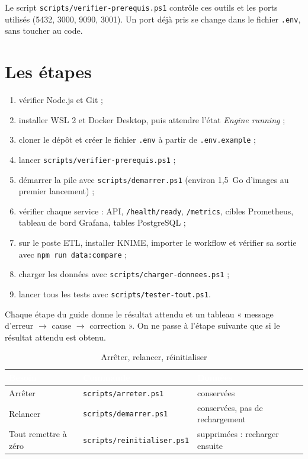 Le script \texttt{scripts/verifier-prerequis.ps1} contrôle ces outils et les ports utilisés
(5432, 3000, 9090, 3001). Un port déjà pris se change dans le fichier \texttt{.env}, sans toucher au code.

\section{Les étapes}
\begin{enumerate}
  \item vérifier Node.js et Git ;
  \item installer WSL 2 et Docker Desktop, puis attendre l'état \emph{Engine running} ;
  \item cloner le dépôt et créer le fichier \texttt{.env} à partir de \texttt{.env.example} ;
  \item lancer \texttt{scripts/verifier-prerequis.ps1} ;
  \item démarrer la pile avec \texttt{scripts/demarrer.ps1} (environ 1,5~Go d'images au premier lancement) ;
  \item vérifier chaque service : API, \texttt{/health/ready}, \texttt{/metrics}, cibles Prometheus, tableau de bord Grafana, tables PostgreSQL ;
  \item sur le poste ETL, installer KNIME, importer le workflow et vérifier sa sortie avec \texttt{npm run data:compare} ;
  \item charger les données avec \texttt{scripts/charger-donnees.ps1} ;
  \item lancer tous les tests avec \texttt{scripts/tester-tout.ps1}.
\end{enumerate}
Chaque étape du guide donne le résultat attendu et un tableau « message d'erreur $\rightarrow$ cause
$\rightarrow$ correction ». On ne passe à l'étape suivante que si le résultat attendu est obtenu.

\begin{table}[H]
\centering\small
\caption{Arrêter, relancer, réinitialiser}
\label{tab:cycle-vie}
\begin{tabularx}{\linewidth}{|l|X|X|}
\hline
\rowcolor{bluedark}\textcolor{white}{\textbf{Besoin}} & \textcolor{white}{\textbf{Commande}} & \textcolor{white}{\textbf{Données}} \\
\hline
Arrêter & \texttt{scripts/arreter.ps1} & conservées \\
\hline
Relancer & \texttt{scripts/demarrer.ps1} & conservées, pas de rechargement \\
\hline
Tout remettre à zéro & \texttt{scripts/reinitialiser.ps1} & supprimées : recharger ensuite \\
\hline
\end{tabularx}
\end{table}

